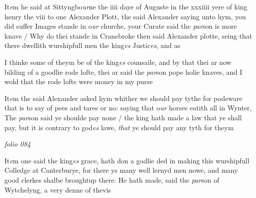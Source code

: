 \documentclass[12pt, a4paper]{book}
\begin{document}
 
			
	
		\ifthenelse{\isodd{\thepage}}
		{\reversemarginpar}
		{\normalmarginpar}
		It\textit{e}m he said at Sittyngbo\textit{ur}ne the iiii daye of Auguste in the xxxiiii
		yere of king henry the viii to one Alexander Plott, the said
		Alexander saying unto hym, you did suffer Images stande
 in o\textit{ur} churche, your Curate said the \textit{par}son is more knave / Why
		do thei stande in Cranebroke then said Alexander plotte, seing
 that there dwellith wurshipfull men the king\textit{es} Justic\textit{es}, and as
 
				\marginpar[\vspace{0.5cm}{\textcolor{Gray}{n}}]{}
			
	
		\ifthenelse{\isodd{\thepage}}
		{\reversemarginpar}
		{\normalmarginpar}
		I thinke some of theym be of the king\textit{es} counsaile, and by that
 thei ar now bilding of a goodlie rode lofte, thei ar said the \textit{par}son
 pope holie knaves, and I wold that the rode lofte were money
 in my purse
	
		
				\marginpar[\vspace{0.5cm}{\textcolor{Gray}{n}}]{}
			
		
			
		
		\ifthenelse{\isodd{\thepage}}
		{\reversemarginpar}
		{\normalmarginpar}
		It\textit{e}m the said Alexander asked hym whither we should pay tythe
 for podeware that is to say of pees and tares or no: saying
 that o\textit{ur} horses eatith all in Wynter, The \textit{par}son said ye shoulde
 pay none / the king hath made a law that ye shall pay, but it is
 contrary to god\textit{es} lawe, \textit{that} ye should pay any tyth for theym


\dotfill
						\newpage
{}

\textit{folio 084}



	
				\marginpar[\vspace{0.5cm}{\textcolor{Gray}{seditious}}]{}
			
	
		\ifthenelse{\isodd{\thepage}}
		{\reversemarginpar}
		{\normalmarginpar}
		It\textit{e}m one said the king\textit{es} grace, hath don a godlie ded in making this
		wurshipfull Colledge at Canterburye, for there ys many well
 lernyd men nowe, and many good clerkes shalbe broughtup there:
 He hath made, said the \textit{par}son of Wytchelyng, a very denne of thevis
\end{document}

